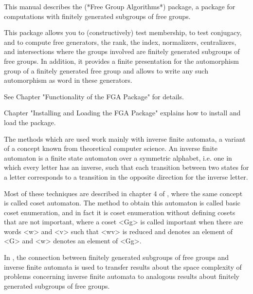 



This manual describes the {\FGA} (*Free Group Algorithms*) package,
a {\GAP} package for computations with finitely generated subgroups of
free groups.

This package allows you to (constructively) test membership, to test
conjugacy, and to compute free generators, the rank, the index,
normalizers, centralizers, and intersections
where the groups involved are finitely generated subgroups of free groups.
%
In addition, it provides a finite presentation for the
automorphism group of a finitely generated free group 
and allows to write any such automorphism as word in
these generators.

See Chapter "Functionality of the FGA Package" for details.

Chapter "Installing and Loading the FGA Package" explains
how to install and load the {\FGA} package.


The methods which are used work mainly with inverse finite automata,
a variant of a concept known from theoretical computer science.
An inverse finite automaton is a finite state automaton over a
symmetric alphabet, i.e. one in which every letter has an inverse,
such that each transition between two states for a letter corresponds
to a transition in the opposite direction for the inverse letter.

Most of these techniques are described in chapter 4 of \cite{Sims94},
where the same concept is called coset automaton.
The method to obtain this automaton is called basic coset enumeration,
and in fact it is coset enumeration without defining cosets that
are not important, where a coset <Gg> is called important when there
are words <w> and <v> such that <wv> is reduced and denotes an element
of <G> and <w> denotes an element of <Gg>.

In \cite{BirgetEtAl00}, the connection between finitely generated
subgroups of free groups and inverse finite automata is used to transfer
results about the space complexity of problems concerning inverse finite
automata to analogous results about finitely generated subgroups of free
groups.

